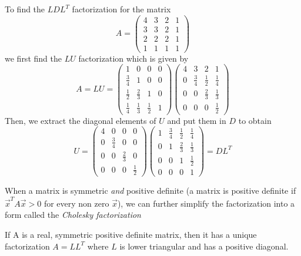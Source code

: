\begin{example}
  To find the \(LDL^{T}\) factorization for the matrix
  \[
A =
  \begin{pmatrix}
    4 & 3 & 2 & 1\\
    3 & 3 & 2 & 1\\
    2 & 2 & 2 & 1\\
    1 & 1 & 1 & 1
  \end{pmatrix}
  \]
  we first find the \(LU\) factorization which is given by
  \[
A = LU =
    \begin{pmatrix}
      1 & 0 & 0 & 0\\
      \frac{3}{4} & 1 & 0 & 0\\
      \frac{1}{2} & \frac{2}{3} & 1 & 0\\
      \frac{1}{4} & \frac{1}{3} & \frac{1}{2} & 1
    \end{pmatrix}
    \begin{pmatrix}
      4 & 3 & 2 & 1\\
      0 & \frac{3}{4} & \frac{1}{2} & \frac{1}{4}\\
      0 & 0 & \frac{2}{3} & \frac{1}{3}\\
      0 & 0 & 0 & \frac{1}{2}
    \end{pmatrix}
    \]
    Then, we extract the diagonal elements of \(U\) and put them in \(D\) to obtain
    \[
U =
    \begin{pmatrix}
      4 & 0 & 0 & 0\\
      0 & \frac{3}{4} & 0 & 0\\
      0 & 0 & \frac{2}{3} & 0\\
      0 & 0 & 0 & \frac{1}{2}
    \end{pmatrix}
    \begin{pmatrix}
      1 & \frac{3}{4} & \frac{1}{2} & \frac{1}{4}\\
      0 & 1 &\frac{2}{3} & \frac{1}{3} \\
      0 & 0 & 1 & \frac{1}{2}\\
      0 & 0 & 0 & 1
    \end{pmatrix}
= DL^{T}
\]
\end{example}
When a matrix is symmetric \textit{and} positive definite (a matrix is positive definite if \(\vec{x}^{T}A \vec{x}>0\) for every non zero \(\vec{x}\)), we can further simplify the factorization into a form called the \textit{Cholesky factorization}

\begin{theorem}
  If A is a real, symmetric positive definite matrix, then it has a unique factorization \(A = LL^{T}\) where \(L\) is lower triangular and has a positive diagonal.
\end{theorem}


